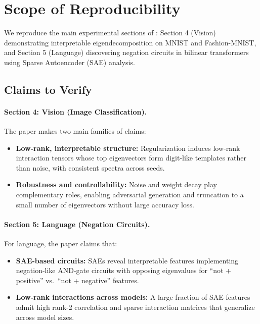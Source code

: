 
\section{Scope of Reproducibility}
\label{sec:scope}

We reproduce the main experimental sections of \citet{pearce2024bilinear}: Section 4 (Vision) demonstrating interpretable eigendecomposition on MNIST and Fashion-MNIST, and Section 5 (Language) discovering negation circuits in bilinear transformers using Sparse Autoencoder (SAE) analysis.

\subsection{Claims to Verify}

\paragraph{Section 4: Vision (Image Classification).}
The paper makes two main families of claims:
\begin{itemize}[leftmargin=*,topsep=0pt,itemsep=1pt]
    \item \textbf{Low-rank, interpretable structure:} Regularization induces low-rank interaction tensors whose top eigenvectors form digit-like templates rather than noise, with consistent spectra across seeds.
    \item \textbf{Robustness and controllability:} Noise and weight decay play complementary roles, enabling adversarial generation and truncation to a small number of eigenvectors without large accuracy loss.
\end{itemize}

\paragraph{Section 5: Language (Negation Circuits).}
For language, the paper claims that:
\begin{itemize}[leftmargin=*,topsep=0pt,itemsep=1pt]
    \item \textbf{SAE-based circuits:} SAEs reveal interpretable features implementing negation-like AND-gate circuits with opposing eigenvalues for ``not + positive'' vs.\ ``not + negative'' features.
    \item \textbf{Low-rank interactions across models:} A large fraction of SAE features admit high rank-2 correlation and sparse interaction matrices that generalize across model sizes.
\end{itemize}

